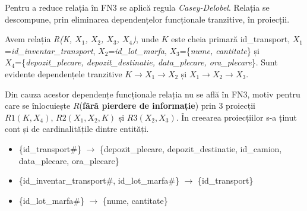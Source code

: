 \documentclass[12pt, a4paper]{article}
\begin{document}
Pentru a reduce relația în FN3 se aplică regula \emph{Casey-Delobel}. Relația se descompune, prin eliminarea dependențelor funcționale tranzitive, în proiecții.

Avem relația \emph{R(K, $X_1$, $X_2$, $X_3$, $X_4$)}, unde $K$ este cheia primară id\_transport, $X_1$=\emph{id\_inventar\_transport}, $X_2$=\emph{id\_lot\_marfa}, $X_3$=\{\emph{nume, cantitate}\} și\\ $X_4$=\{\emph{depozit\_plecare, depozit\_destinatie, data\_plecare, ora\_plecare}\}. Sunt \\evidente dependențele tranzitive $K\rightarrow X_1\rightarrow X_2$ și $X_1\rightarrow X_2\rightarrow X_3$.

Din cauza acestor dependențe funcționale relația nu se află în FN3, motiv pentru care se înlocuiește $R$(\textbf{fără pierdere de informație}) prin 3 proiecții $R1(K, X_4)$, $R2(X_1, X_2, K)$ și $R3(X_2, X_3)$. În creearea proiecțiilor s-a ținut cont și de cardinalitățile dintre entități.

\begin{itemize}
    \item \{id\_transport\#\} $\rightarrow$ \{depozit\_plecare, depozit\_destinatie, id\_camion, \\data\_plecare, ora\_plecare\}
    \item \{id\_inventar\_transport\#, id\_lot\_marfa\#\} $\rightarrow$ \{id\_transport\}
    \item \{id\_lot\_marfa\#\} $\rightarrow$ \{nume, cantitate\}
\end{itemize}

\begin{table}[!htbp]
\begin{center}
\caption{Proiectia \emph{R1-1(K, $X_4$)}}\label{tab11-1}
\end{center}
\end{table}
\end{document}
